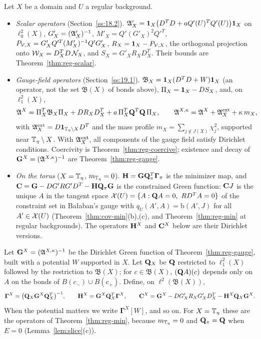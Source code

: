 \begin{readingbox}
Let $X$ be a domain and $U$ a regular background.
\begin{itemize}
\item \emph{Scalar operators} (Section~\ref{ss:18.2}). $\mathfrak A'_X=\mathbf 1_X\big(D^TD+aQ'(U)^TQ'(U)\big)\mathbf 1_X$ on $\ell^2_0(X)$, $G'_X=(\mathfrak A'_X)^{-1}$, $M'_X=Q'(G'_X)^2Q'^T$, $P_{\mathcal V,X}=G'_XQ'^T(M'_X)^{-1}Q'G'_X$, $R_X=\mathbf 1_X-P_{\mathcal V,X}$, the orthogonal projection onto $\mathcal W_X=D^T_XD\,\mathcal N_X$, and $S_X=G'_XR_XD^T_X$. Their bounds are Theorem~\ref{thm:reg-scalar}.
\item \emph{Gauge-field operators} (Section~\ref{ss:19.1}). $\mathfrak B_X=\mathbf 1_X(D^TD+W)\mathbf 1_X$ (an operator, not the set $\mathfrak B(X)$ of bonds above), $\Pi_X=\mathbf 1_X-DS_X$, and, on $\ell^2_1(X)$,
\[
\mathfrak A^X=\Pi_X^T\mathfrak B_X\Pi_X+DR_XD^T_X+a\,\Pi_X^T\mathbf Q^T\mathbf Q\,\Pi_X,\qquad\mathfrak A^{X,\kappa}=\mathfrak A^X+\mathfrak A^{\rm ext}_X+\kappa\,m_X,
\]
with $\mathfrak A^{\rm ext}_X=D\mathbf 1_{\mathbb T_\eta\setminus X}D^T$ and the mass profile $m_X=\sum_{j\notin J(X)}\chi_j^2$, supported near $\mathbb T_\eta\setminus X$. With $\mathfrak A^{\rm ext}_X$, all components of the gauge field satisfy Dirichlet conditions. Coercivity is Theorem~\ref{thm:reg-coercive}; existence and decay of $\mathbf G^X=(\mathfrak A^{X,\kappa})^{-1}$ are Theorem~\ref{thm:reg-gauge}.
\item \emph{On the torus} ($X=\mathbb T_\eta$, $m_{\mathbb T_\eta}=0$). $\mathbf H=\mathbf G\mathbf Q_\pi^T\boldsymbol\Gamma_\pi$ is the minimizer map, and $\mathbf C=\mathbf G-DG'RG'D^T-\mathbf H\mathbf Q_\pi\mathbf G$ is the constrained Green function: $\mathbf C J$ is the unique $A$ in the tangent space $\cX(U)=\{A:\bQ A=0,\ RD^TA=0\}$ of the constraint set in Ba\l aban's gauge with $q_U(A',A)=\mathrm b(A',J)$ for all $A'\in\mathcal X(U)$ (Theorem~\ref{thm:cov-min}(b),(c), and Theorem~\ref{thm:reg-min} at regular backgrounds). The operators $\mathbf H^X$ and $\mathbf C^X$ below are their Dirichlet versions.
\end{itemize}
\end{readingbox}

Let $\mathbf G^X=(\mathfrak A^{X,\kappa})^{-1}$ be the Dirichlet Green function of Theorem~\ref{thm:reg-gauge}, built with a potential $W$ supported in $X$. Let $\mathbf Q_X$ be $\mathbf Q$ restricted to $\ell^2_1(X)$ followed by the restriction to $\mathfrak B(X)$; for $c\in\mathfrak B(X)$, $(\mathbf Q A)(c)$ depends only on $A$ on the bonds of $B(c_-)\cup B(c_+)$. Define, on $\ell^2(\mathfrak B(X))$,
\[
\boldsymbol\Gamma^X=\big(\mathbf Q_X\mathbf G^X\mathbf Q_X^T\big)^{-1},\qquad\mathbf H^X=\mathbf G^X\mathbf Q_X^T\boldsymbol\Gamma^X,\qquad\mathbf C^X=\mathbf G^X-DG'_XR_XG'_XD^T_X-\mathbf H^X\mathbf Q_X\mathbf G^X .
\]
When the potential matters we write $\boldsymbol\Gamma^X[W]$, and so on. For $X=\mathbb T_\eta$ these are the operators of Theorem~\ref{thm:reg-min}, because $m_{\mathbb T_\eta}=0$ and $\mathbf Q_\pi=\mathbf Q$ when $E=0$ (Lemma~\ref{lem:slice}(c)).

